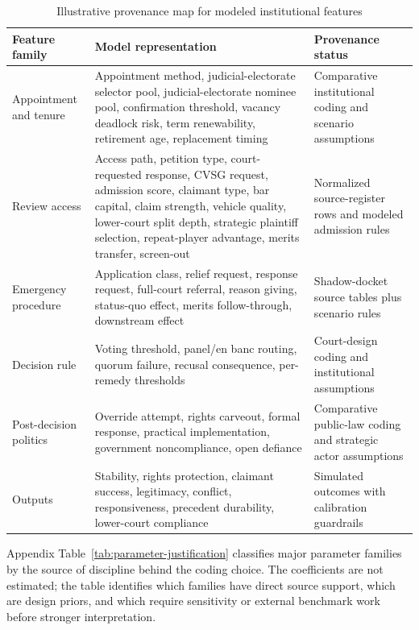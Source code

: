 \documentclass[
    journal=jlc,
    manuscript=research-article,
    year=2026,
  ]{cup-journal}
\providecommand{\Description}[1]{}
\begin{document}
\begin{table}[hbt!]
\centering
\caption{Illustrative provenance map for modeled institutional features}
\label{tab:provenance}
\Description{Table mapping modeled institutional feature families to simulator representations and provenance status.}
\small
\begin{tabular}{>{\raggedright\arraybackslash}p{1.45in}>{\raggedright\arraybackslash}p{1.75in}>{\raggedright\arraybackslash}p{1.65in}}
\toprule
Feature family & Model representation & Provenance status \\
\midrule
Appointment and tenure & Appointment method, judicial-electorate selector pool, judicial-electorate nominee pool, confirmation threshold, vacancy deadlock risk, term renewability, retirement age, replacement timing & Comparative institutional coding and scenario assumptions \\
Review access & Access path, petition type, court-requested response, CVSG request, admission score, claimant type, bar capital, claim strength, vehicle quality, lower-court split depth, strategic plaintiff selection, repeat-player advantage, merits transfer, screen-out & Normalized source-register rows and modeled admission rules \\
Emergency procedure & Application class, relief request, response request, full-court referral, reason giving, status-quo effect, merits follow-through, downstream effect & Shadow-docket source tables plus scenario rules \\
Decision rule & Voting threshold, panel/en banc routing, quorum failure, recusal consequence, per-remedy thresholds & Court-design coding and institutional assumptions \\
Post-decision politics & Override attempt, rights carveout, formal response, practical implementation, government noncompliance, open defiance & Comparative public-law coding and strategic actor assumptions \\
Outputs & Stability, rights protection, claimant success, legitimacy, conflict, responsiveness, precedent durability, lower-court compliance & Simulated outcomes with calibration guardrails \\
\bottomrule
\end{tabular}
\end{table}

Appendix Table~\ref{tab:parameter-justification} classifies major parameter families by the source of discipline behind the coding choice. The coefficients are not estimated; the table identifies which families have direct source support, which are design priors, and which require sensitivity or external benchmark work before stronger interpretation.
\end{document}
